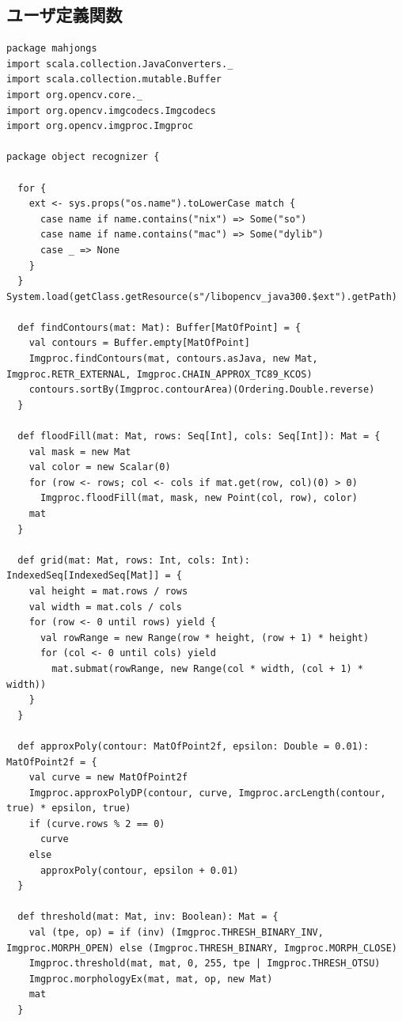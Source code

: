 \documentclass{jsarticle}
\begin{document}
\subsection{ユーザ定義関数}
\begin{lstlisting}[caption=package.scala,label=package]
package mahjongs
import scala.collection.JavaConverters._
import scala.collection.mutable.Buffer
import org.opencv.core._
import org.opencv.imgcodecs.Imgcodecs
import org.opencv.imgproc.Imgproc

package object recognizer {

  for {
    ext <- sys.props("os.name").toLowerCase match {
      case name if name.contains("nix") => Some("so")
      case name if name.contains("mac") => Some("dylib")
      case _ => None
    }
  } System.load(getClass.getResource(s"/libopencv_java300.$ext").getPath)

  def findContours(mat: Mat): Buffer[MatOfPoint] = {
    val contours = Buffer.empty[MatOfPoint]
    Imgproc.findContours(mat, contours.asJava, new Mat, Imgproc.RETR_EXTERNAL, Imgproc.CHAIN_APPROX_TC89_KCOS)
    contours.sortBy(Imgproc.contourArea)(Ordering.Double.reverse)
  }

  def floodFill(mat: Mat, rows: Seq[Int], cols: Seq[Int]): Mat = {
    val mask = new Mat
    val color = new Scalar(0)
    for (row <- rows; col <- cols if mat.get(row, col)(0) > 0)
      Imgproc.floodFill(mat, mask, new Point(col, row), color)
    mat
  }

  def grid(mat: Mat, rows: Int, cols: Int): IndexedSeq[IndexedSeq[Mat]] = {
    val height = mat.rows / rows
    val width = mat.cols / cols
    for (row <- 0 until rows) yield {
      val rowRange = new Range(row * height, (row + 1) * height)
      for (col <- 0 until cols) yield
        mat.submat(rowRange, new Range(col * width, (col + 1) * width))
    }
  }

  def approxPoly(contour: MatOfPoint2f, epsilon: Double = 0.01): MatOfPoint2f = {
    val curve = new MatOfPoint2f
    Imgproc.approxPolyDP(contour, curve, Imgproc.arcLength(contour, true) * epsilon, true)
    if (curve.rows % 2 == 0)
      curve
    else
      approxPoly(contour, epsilon + 0.01)
  }

  def threshold(mat: Mat, inv: Boolean): Mat = {
    val (tpe, op) = if (inv) (Imgproc.THRESH_BINARY_INV, Imgproc.MORPH_OPEN) else (Imgproc.THRESH_BINARY, Imgproc.MORPH_CLOSE)
    Imgproc.threshold(mat, mat, 0, 255, tpe | Imgproc.THRESH_OTSU)
    Imgproc.morphologyEx(mat, mat, op, new Mat)
    mat
  }


\end{lstlisting}
\end{document}

